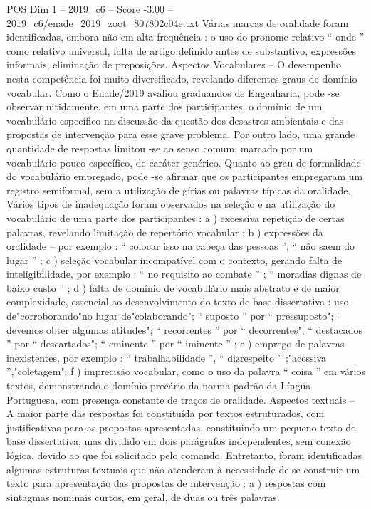 \begin{textsample}{POS Dim 1 – 2019\_c6 – Score -3.00 – 2019\_c6/enade\_2019\_zoot\_807802c04e.txt}
Várias marcas de oralidade foram identificadas, embora não em alta frequência : o uso do pronome relativo “ onde ” como relativo universal, falta de artigo definido antes de substantivo, expressões informais, eliminação de preposições.
Aspectos Vocabulares – O desempenho nesta competência foi muito diversificado, revelando diferentes graus de domínio vocabular.
Como o Enade/2019 avaliou graduandos de Engenharia, pode -se observar nitidamente, em uma parte dos participantes, o domínio de um vocabulário específico na discussão da questão dos desastres ambientais e das propostas de intervenção para esse grave problema.
Por outro lado, uma grande quantidade de respostas limitou -se ao senso comum, marcado por um vocabulário pouco específico, de caráter genérico.
Quanto ao grau de formalidade do vocabulário empregado, pode -se afirmar que os participantes empregaram um registro semiformal, sem a utilização de gírias ou palavras típicas da oralidade.
Vários tipos de inadequação foram observados na seleção e na utilização do vocabulário de uma parte dos participantes : a ) excessiva repetição de certas palavras, revelando limitação de repertório vocabular ; b ) expressões da oralidade – por exemplo : “ colocar isso na cabeça das pessoas ”, “ não saem do lugar ” ; c ) seleção vocabular incompatível com o contexto, gerando falta de inteligibilidade, por exemplo : “ no requisito ao combate ” ; “ moradias dignas de baixo custo ” ; d ) falta de domínio de vocabulário mais abstrato e de maior complexidade, essencial ao desenvolvimento do texto de base dissertativa : uso de"corroborando"no lugar de"colaborando"; “ suposto ” por “ pressuposto"; “ devemos obter algumas atitudes"; “ recorrentes ” por “ decorrentes"; “ destacados ” por “ descartados"; “ eminente ” por “ iminente ” ; e ) emprego de palavras inexistentes, por exemplo : “ trabalhabilidade ”, “ dizrespeito ” ;"acessiva ”,"coletagem"; f ) imprecisão vocabular, como o uso da palavra “ coisa ” em vários textos, demonstrando o domínio precário da norma-padrão da Língua Portuguesa, com presença constante de traços de oralidade.
Aspectos textuais – A maior parte das respostas foi constituída por textos estruturados, com justificativas para as propostas apresentadas, constituindo um pequeno texto de base dissertativa, mas dividido em dois parágrafos independentes, sem conexão lógica, devido ao que foi solicitado pelo comando.
Entretanto, foram identificadas algumas estruturas textuais que não atenderam à necessidade de se construir um texto para apresentação das propostas de intervenção : a ) respostas com sintagmas nominais curtos, em geral, de duas ou três palavras.

\end{textsample}
